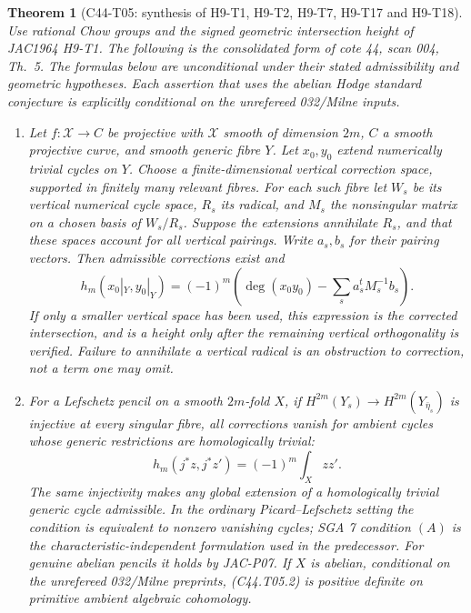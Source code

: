 \documentclass[11pt]{article}
\newtheorem{theorem}{Theorem}[section]
\theoremstyle{remark}\newtheorem{remark}[theorem]{Remark}
\begin{document}
\begin{theorem}[C44-T05: synthesis of H9-T1, H9-T2, H9-T7,
H9-T17 and H9-T18]\label{thm:final-th5}
Use rational Chow groups and the signed geometric intersection height
of JAC1964 H9-T1. The following is the consolidated form of cote 44,
scan 004, Th.~5. The formulas below are unconditional under their
stated admissibility and geometric hypotheses. Each assertion that
uses the abelian Hodge standard conjecture is explicitly conditional
on the unrefereed 032/Milne inputs.

\begin{enumerate}
\item Let $f:\mathcal X\to C$ be projective with $\mathcal X$ smooth
of dimension $2m$, $C$ a smooth projective curve, and smooth generic
fibre $Y$. Let $x_0,y_0$ extend numerically trivial cycles on $Y$.
Choose a finite-dimensional vertical correction space, supported in
finitely many relevant fibres. For each such fibre let $W_s$ be its vertical numerical cycle
space, $R_s$ its radical, and $M_s$ the nonsingular matrix on a chosen
basis of $W_s/R_s$. Suppose the extensions annihilate $R_s$, and
that these spaces account for all vertical pairings. Write $a_s,b_s$
for their pairing vectors. Then admissible corrections exist and
\[
 h_m(x_0|_Y,y_0|_Y)=(-1)^m
 \left(\deg(x_0y_0)-\sum_s a_s^{t}M_s^{-1}b_s\right).
 \tag{C44.T05.1}
\]
If only a smaller vertical space has been used, this expression is
the corrected intersection, and is a height only after the remaining
vertical orthogonality is verified. Failure to annihilate a vertical
radical is an obstruction to correction, not a term one may omit.

\item For a Lefschetz pencil on a smooth $2m$-fold $X$, if
$H^{2m}(Y_s)\to H^{2m}(Y_{\bar\eta_s})$ is injective at every
singular fibre, all corrections vanish for ambient cycles whose
generic restrictions are homologically trivial:
\[
                  h_m(j^*z,j^*z')=(-1)^m\int_Xzz'.
 \tag{C44.T05.2}
\]
The same injectivity makes any global extension of a homologically
trivial generic cycle admissible. In the ordinary Picard--Lefschetz
setting the condition is equivalent to nonzero vanishing cycles;
SGA 7 condition $(A)$ is the characteristic-independent formulation
used in the predecessor. For genuine abelian pencils it holds by
JAC-P07. If $X$ is abelian, conditional on the unrefereed 032/Milne
preprints, (C44.T05.2) is positive definite
on primitive ambient algebraic cohomology.


\end{enumerate}
\end{theorem}
\end{document}
